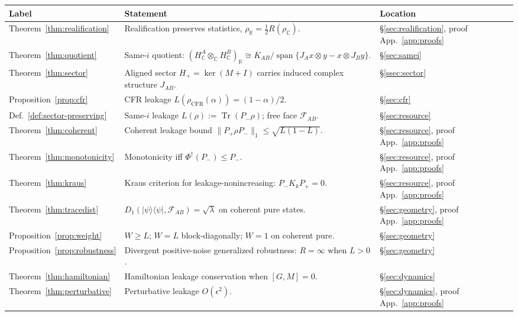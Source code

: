 \documentclass[a4paper,onecolumn,noarxiv]{quantumarticle}
\theoremstyle{plain}
\theoremstyle{definition}
\theoremstyle{remark}
\newcommand{\R}{\mathbb{R}}
\newcommand{\C}{\mathbb{C}}
\newcommand{\HC}{H_{\C}}
\newcommand{\KAB}{K_{AB}}
\newcommand{\Pplus}{P_{+}}
\newcommand{\Pminus}{P_{-}}
\newcommand{\Hplus}{H_{+}}
\newcommand{\Mop}{M}
\newcommand{\JAB}{J_{AB}}
\newcommand{\FAB}{\mathcal{F}_{AB}}
\newcommand{\Tr}{\operatorname{Tr}}
\newcommand{\Phid}{\Phi^{\dagger}}
\newcommand{\Lleak}{L}
\begin{document}
\begin{center}
\renewcommand{\arraystretch}{1.25}
\begin{tabular}{@{}lll@{}}
\toprule
Label & Statement & Location \\
\midrule
Theorem~\ref{thm:realification}
  & Realification preserves statistics, $\rho_\R=\tfrac{1}{2}R(\rho_\C)$.
  & \S\ref{sec:realification}, proof App.~\ref{app:proofs} \\
Theorem~\ref{thm:quotient}
  & Same-$i$ quotient: $(\HC^A\otimes_\C\HC^B)_\R\cong\KAB/\operatorname{span}\{J_Ax\otimes y-x\otimes J_By\}$.
  & \S\ref{sec:samei} \\
Theorem~\ref{thm:sector}
  & Aligned sector $\Hplus=\ker(\Mop+I)$ carries induced complex structure $\JAB$.
  & \S\ref{ssec:sector} \\
Proposition~\ref{prop:cfr}
  & CFR leakage $\Lleak(\rho_{\mathrm{CFR}}(\alpha))=(1-\alpha)/2$.
  & \S\ref{sec:cfr} \\
Def.~\ref{def:sector-preserving}
  & Same-$i$ leakage $\Lleak(\rho):=\Tr(\Pminus\rho)$; free face $\FAB$.
  & \S\ref{sec:resource} \\
Theorem~\ref{thm:coherent}
  & Coherent leakage bound $\|\Pplus\rho\Pminus\|_1\le\sqrt{\Lleak(1-\Lleak)}$.
  & \S\ref{sec:resource}, proof App.~\ref{app:proofs} \\
Theorem~\ref{thm:monotonicity}
  & Monotonicity iff $\Phid(\Pminus)\le\Pminus$.
  & \S\ref{sec:resource}, proof App.~\ref{app:proofs} \\
Theorem~\ref{thm:kraus}
  & Kraus criterion for leakage-nonincreasing: $\Pminus K_k\Pplus=0$.
  & \S\ref{sec:resource}, proof App.~\ref{app:proofs} \\
Theorem~\ref{thm:tracedist}
  & $D_1(|\psi\rangle\langle\psi|,\FAB)=\sqrt{\lambda}$ on coherent pure states.
  & \S\ref{sec:geometry}, proof App.~\ref{app:proofs} \\
Proposition~\ref{prop:weight}
  & $W\ge\Lleak$; $W=\Lleak$ block-diagonally; $W=1$ on coherent pure.
  & \S\ref{sec:geometry} \\
Proposition~\ref{prop:robustness}
  & Divergent positive-noise generalized robustness: $R=\infty$ when $\Lleak>0$.
  & \S\ref{sec:geometry} \\
Theorem~\ref{thm:hamiltonian}
  & Hamiltonian leakage conservation when $[G,\Mop]=0$.
  & \S\ref{sec:dynamics} \\
Theorem~\ref{thm:perturbative}
  & Perturbative leakage $O(\epsilon^2)$.
  & \S\ref{sec:dynamics}, proof App.~\ref{app:proofs} \\

\end{tabular}
\end{center}
\end{document}
